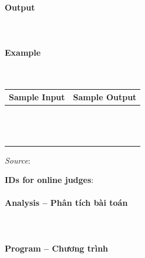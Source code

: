 \documentclass{article}
\begin{document}
\paragraph{Output}\mbox{} \\


\paragraph{Example}\mbox{} \\

\begin{table}[h]
    \centering
    \begin{tabular}{|l|r|}
        \hline
        \textbf{Sample Input} & \textbf{Sample Output} \\
        \hline
		&  \\ 
		&  \\ 
		&  \\ 
		&  \\ 
		&  \\
		&  \\ 
		&  \\ 
		&  \\ 
		&  \\ 
		&  \\ 
		&  \\ 
		&  \\
		&  \\ \hline
    \end{tabular}
\end{table}

\textit{Source}: 

\textbf{IDs for online judges}:

\paragraph{Analysis -- Phân tích bài toán} \mbox{} \\



\paragraph{Program -- Chương trình} \mbox{} \\


\begin{lstlisting}
	
	
\end{lstlisting}

\end{document}
